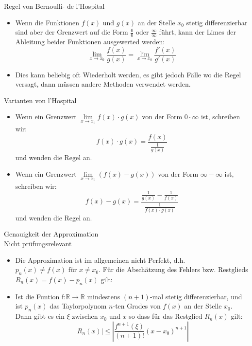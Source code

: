 \begin{definition}{Regel von Bernoulli- de l’Hospital}\\
  \begin{itemize}
    \item Wenn die Funktionen \(f(x)\text{ und }g(x)\) an der Stelle \(x_0\) stetig differenzierbar sind aber der
      Grenzwert auf die Form \(\frac{0}{0}\text{ oder }\frac{\infty}{\infty}\) führt, kann der Limes der Ableitung
      beider Funktionen ausgewerted werden:
      \[\underset{x\rightarrow x_0}\lim\frac{f(x)}{g(x)}=\underset{x\rightarrow x_0}{\lim}\frac{f'(x)}{g'(x)}\]
    \item Dies kann beliebig oft Wiederholt werden, es gibt jedoch Fälle wo die Regel versagt, dann müssen andere
      Methoden verwendet werden.
  \end{itemize}
\end{definition}
\begin{definition}{Varianten von l'Hospital}\\
  \begin{itemize}
    \item Wenn ein Grenzwert \(\underset{x\rightarrow x_0}{\lim}f(x)\cdot g(x)\) von der Form \(0\cdot \infty\) ist,
      schreiben wir:
      \[f(x)\cdot g(x)=\frac{f(x)}{\frac{1}{g(x)}}\]
      und wenden die Regel an.
    \item Wenn ein Grenzwert \(\underset{x\rightarrow x_0}{\lim}(f(x)-g(x))\) von der Form \(\infty - \infty\) ist,
      schreiben wir:
      \[f(x)-g(x)=\frac{\frac{1}{g(x)}-\frac{1}{f(x)}}{\frac{1}{f(x)\cdot g(x)}}\]
      und wenden die Regel an.
  \end{itemize}
\end{definition}
\begin{definition}{Genauigkeit der Approximation}\\
  Nicht prüfungsrelevant\\
  \begin{itemize}
    \item Die Approximation ist im allgemeinen nicht Perfekt, d.h. \(p_n(x)\neq f(x)\text{ für }x\neq x_0\). Für die
      Abschätzung des Fehlers bzw. Restglieds \(R_n(x)=f(x)-p_n(x)\) gilt:
    \item Ist die Funtion f:\(\mathbb{R}\rightarrow\mathbb{R}\) mindestens \((n+1)\)-mal stetig differenzierbar, und ist 
    \(p_n(x)\) das Taylorpolynom \(n\)-ten Grades von \(f(x)\) an der Stelle \(x_0\).
    Dann gibt es ein \(\xi\) zwischen \(x_0\) und \(x\) so dass für das Restglied \(R_n(x)\) gilt:
    \[|R_n(x)|\leq \left|\frac{f^{n+1}(\xi)}{(n+1)!}(x-x_0)^{n+1}\right|\]
  \end{itemize}
\end{definition}
